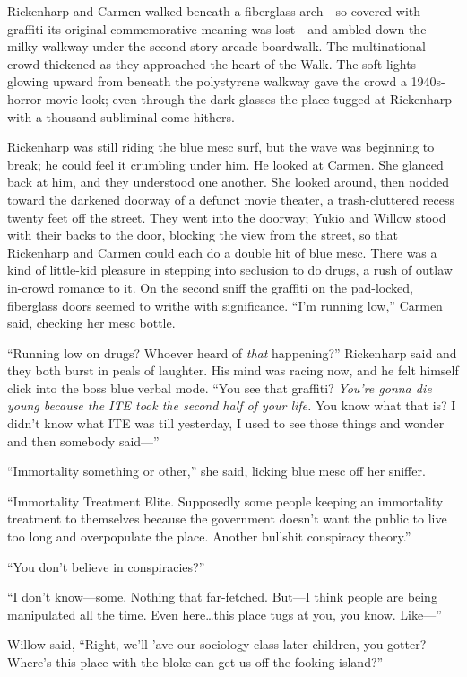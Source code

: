 Rickenharp and Carmen walked beneath a fiberglass arch---so covered with graffiti its original commemorative meaning was lost---and ambled down the milky walkway under the second-story arcade boardwalk. The multinational crowd thickened as they approached the heart of the Walk. The soft lights glowing upward from beneath the polystyrene walkway gave the crowd a 1940s-horror-movie look; even through the dark glasses the place tugged at Rickenharp with a thousand subliminal come-hithers.

Rickenharp was still riding the blue mesc surf, but the wave was beginning to break; he could feel it crumbling under him. He looked at Carmen. She glanced back at him, and they understood one another. She looked around, then nodded toward the darkened doorway of a defunct movie theater, a trash-cluttered recess twenty feet off the street. They went into the doorway; Yukio and Willow stood with their backs to the door, blocking the view from the street, so that Rickenharp and Carmen could each do a double hit of blue mesc. There was a kind of little-kid pleasure in stepping into seclusion to do drugs, a rush of outlaw in-crowd romance to it. On the second sniff the graffiti on the pad-locked, fiberglass doors seemed to writhe with significance. ``I'm running low,'' Carmen said, checking her mesc bottle.

``Running low on drugs? Whoever heard of \textit{that} happening?'' Rickenharp said and they both burst in peals of laughter. His mind was racing now, and he felt himself click into the boss blue verbal mode. ``You see that graffiti? \textit{You're gonna die young because the ITE took the second half of your life.} You know what that is? I didn't know what ITE was till yesterday, I used to see those things and wonder and then somebody said---''

``Immortality something or other,'' she said, licking blue mesc off her sniffer.

``Immortality Treatment Elite. Supposedly some people keeping an immortality treatment to themselves because the government doesn't want the public to live too long and overpopulate the place. Another bullshit conspiracy theory.''

``You don't believe in conspiracies?''

``I don't know---some. Nothing that far-fetched. But---I think people are being manipulated all the time. Even here\ldots this place tugs at you, you know. Like---''

Willow said, ``Right, we'll 'ave our sociology class later children, you gotter? Where's this place with the bloke can get us off the fooking island?''

